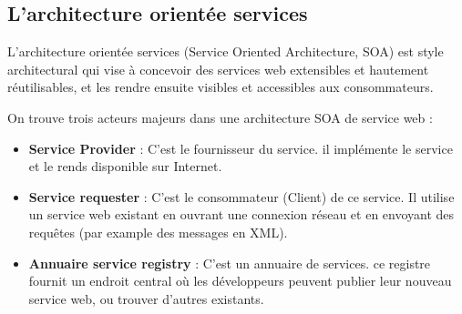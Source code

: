 		\subsection{L'architecture orientée services} 
				L'architecture orientée services (Service Oriented Architecture, SOA) est style architectural qui vise à concevoir des services web extensibles et hautement réutilisables, et les rendre ensuite visibles et accessibles aux consommateurs.
				
	On trouve trois acteurs majeurs dans une architecture SOA de service web :
				\begin{itemize}
				\item \textbf{Service Provider} : 
					C'est le fournisseur du service. il implémente le service et le rends disponible sur Internet.
				\item \textbf{Service requester} :
					C'est le consommateur (Client) de ce service. Il utilise un service web existant en ouvrant une connexion réseau et en envoyant des requêtes (par example des messages en XML).
				\item \textbf{Annuaire service registry} : 
				C'est un annuaire de services. ce registre fournit un endroit central où les développeurs peuvent publier leur nouveau service web, ou trouver d'autres existants.\newline 
				\end{itemize}

